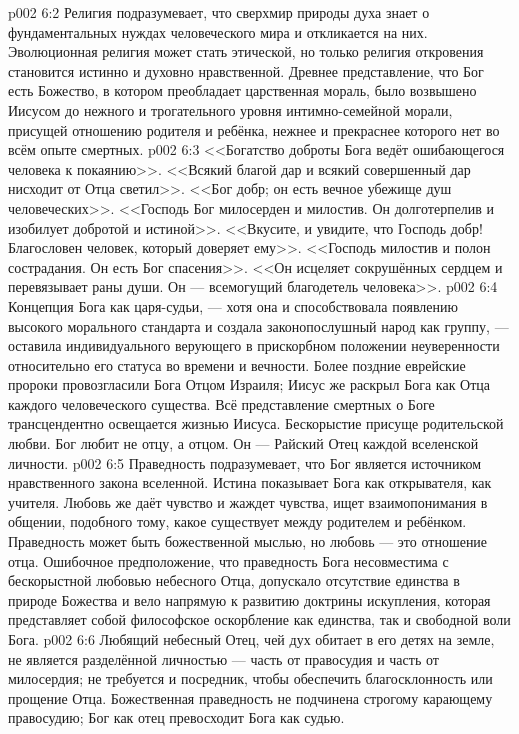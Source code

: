 \vs p002 6:2 Религия подразумевает, что сверхмир природы духа знает о фундаментальных нуждах человеческого мира и откликается на них. Эволюционная религия может стать этической, но только религия откровения становится истинно и духовно нравственной. Древнее представление, что Бог есть Божество, в котором преобладает царственная мораль, было возвышено Иисусом до нежного и трогательного уровня интимно\hyp{}семейной морали, присущей отношению родителя и ребёнка, нежнее и прекраснее которого нет во всём опыте смертных.
\vs p002 6:3 \pc <<Богатство доброты Бога ведёт ошибающегося человека к покаянию>>. <<Всякий благой дар и всякий совершенный дар нисходит от Отца светил>>. <<Бог добр; он есть вечное убежище душ человеческих>>. <<Господь Бог милосерден и милостив. Он долготерпелив и изобилует добротой и истиной>>. <<Вкусите, и увидите, что Господь добр! Благословен человек, который доверяет ему>>. <<Господь милостив и полон сострадания. Он есть Бог спасения>>. <<Он исцеляет сокрушённых сердцем и перевязывает раны души. Он --- всемогущий благодетель человека>>.
\vs p002 6:4 \pc Концепция Бога как царя\hyp{}судьи, --- хотя она и способствовала появлению высокого морального стандарта и создала законопослушный народ как группу, --- оставила индивидуального верующего в прискорбном положении неуверенности относительно его статуса во времени и вечности. Более поздние еврейские пророки провозгласили Бога Отцом Израиля; Иисус же раскрыл Бога как Отца каждого человеческого существа. Всё представление смертных о Боге трансцендентно освещается жизнью Иисуса. Бескорыстие присуще родительской любви. Бог любит не  отцу, а  отцом. Он --- Райский Отец каждой вселенской личности.
\vs p002 6:5 \pc Праведность подразумевает, что Бог является источником нравственного закона вселенной. Истина показывает Бога как открывателя, как учителя. Любовь же даёт чувство и жаждет чувства, ищет взаимопонимания в общении, подобного тому, какое существует между родителем и ребёнком. Праведность может быть божественной мыслью, но любовь --- это отношение отца. Ошибочное предположение, что праведность Бога несовместима с бескорыстной любовью небесного Отца, допускало отсутствие единства в природе Божества и вело напрямую к развитию доктрины искупления, которая представляет собой философское оскорбление как единства, так и свободной воли Бога.
\vs p002 6:6 Любящий небесный Отец, чей дух обитает в его детях на земле, не является разделённой личностью --- часть от правосудия и часть от милосердия; не требуется и посредник, чтобы обеспечить благосклонность или прощение Отца. Божественная праведность не подчинена строгому карающему правосудию; Бог как отец превосходит Бога как судью.
